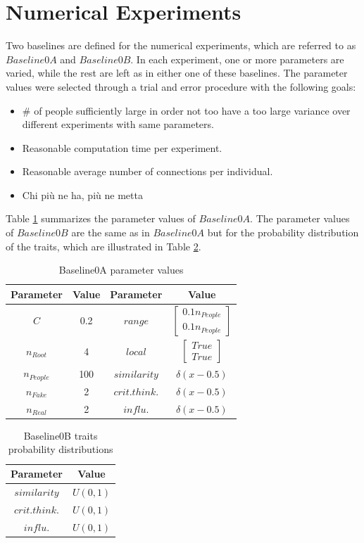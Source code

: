 \section{Numerical Experiments}
\label{sec:experiments}
Two baselines are defined for the numerical experiments, which are referred to as $Baseline0A$ and $Baseline0B$. In each experiment, one or more parameters are varied, while the rest are left as in either one of these baselines. The parameter values were selected through a trial and error procedure with the following goals:
\begin{itemize}
	\item
	$\#$ of people sufficiently large in order not too have a too large variance over different experiments with same parameters.
	\item
	Reasonable computation time per experiment.
	\item
	Reasonable average number of connections per individual.
	\item
	Chi più ne ha, più ne metta
\end{itemize}
Table \ref{table:1} summarizes the parameter values of $Baseline0A$. \newline
The parameter values of $Baseline0B$ are the same as in $Baseline0A$ but for the probability distribution of the traits, which are illustrated in Table \ref{table:2}.
\begin{table}[h!]
\centering
\begin{tabular}{||c | c || c | c ||}
	\hline
	Parameter&Value&Parameter&Value\\
	\hline
	$C$&0.2&$range$& $\begin{bmatrix} 0.1n_{People} \\ 0.1 n_{People}\end{bmatrix}$\\
	$n_{Root}$&4&$local$&$\begin{bmatrix} True \\ True\end{bmatrix}$\\
	$n_{People}$&100&$similarity$&$\delta(x-0.5)$\\
	$n_{Fake}$&2&$crit.think.$&$\delta(x-0.5)$\\
	$n_{Real}$&2&$influ.$&$\delta(x-0.5)$\\
	\hline
\end{tabular}
\newline
\caption{Baseline0A parameter values}
\label{table:1}
\end{table}
\begin{table}[h!]
\centering
	\begin{tabular}{||c | c||}
	\hline
	Parameter&Value\\
	\hline
	$similarity$&$U(0,1)$\\
	$crit.think.$&$U(0,1)$\\
	$influ.$&$U(0,1)$\\
	\hline
	\end{tabular}
	\newline
	\caption{Baseline0B traits probability distributions}
	\label{table:2}
\end{table}
